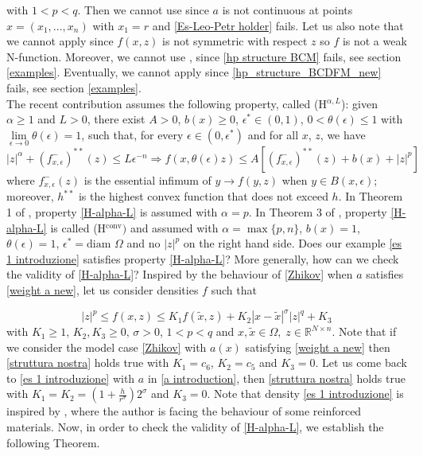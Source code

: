 \documentclass[a4paper,10pt]{article}
\newcommand{\numberset}{\mathbb}
\newcommand{\R}{\numberset{R}}
\theoremstyle{plain}
\theoremstyle{definition}
\def\R{\mathbb{R}}
\numberwithin{equation}{section} \makeatletter
\begin{document}
with $1< p< q$. Then we cannot use \cite{Esposito-Leonetti-Petricca} since $a$ is not continuous at points $x=(x_1,...,x_n)$ with $x_1 = r$  and \eqref{Es-Leo-Petr holder} fails. Let us also note that we cannot apply \cite{BC} since $f(x,z)$ is not symmetric with respect $z$ so $f$ is not a weak N-function. Moreover, we cannot use \cite{BCM}, since \eqref{hp structure BCM} fails, see section \ref{examples}. Eventually, we cannot apply \cite{BCDFM}
since \eqref{hp_structure_BCDFM_new} fails, see section \ref{examples}.\\
The recent contribution \cite{BMT2024} assumes the following property, called (H$^{\alpha,L}$): given $\alpha \geq 1$ and $L>0$, there exist $A>0$, $b(x) \geq 0$, $\epsilon^* \in (0,1)$, $0 < \theta(\epsilon) \leq 1$ with $\lim\limits_{\epsilon \to 0} \theta(\epsilon) = 1$, such that, for every $\epsilon \in (0, \epsilon^*)$ and for all $x$, $z$, we have
\begin{equation}
    \label{H-alpha-L}
  |z|^\alpha +  (f^-_{x,\epsilon})^{**}(z) 
  \leq L \epsilon^{-n} 
  \Longrightarrow
  f(x,\theta(\epsilon) z) \leq A [(f^-_{x,\epsilon})^{**}(z) + b(x) +  |z|^p]
\end{equation}
where $f^-_{x,\epsilon}(z)$ is the essential infimum of $y \to f(y,z)$ when $y \in B(x,\epsilon)$; moreover,  $h^{**}$ is the highest convex function that does not exceed $h$. In Theorem 1 of \cite{BMT2024}, property \eqref{H-alpha-L} is assumed with $\alpha = p$. 
In Theorem 3 of \cite{BBCLM}, property \eqref{H-alpha-L} is called (H$^{\text{conv}})$ and assumed with $\alpha = \max\{p , n \}$, $b(x)=1$, $\theta(\epsilon)=1$, $\epsilon^* = \text{diam } \Omega$ and no $|z|^p$ on the right hand side. Does our example \eqref{es 1 introduzione} satisfies property \eqref{H-alpha-L}? More generally, how can we check the validity of \eqref{H-alpha-L}? Inspired by 
the behaviour of \eqref{Zhikov} when $a$ satisfies \eqref{weight a new}, 
let us 
consider densities {
$f$} such that

\begin{equation}\label{struttura nostra}
  |z|^p\le  f(x,z) \le K_1 f(\tilde{x},z)+K_2|x-\tilde{x}|^{\sigma}|z|^q+K_3 
\end{equation} 
with $K_1\ge 1, \,  K_2, K_3\ge 0,\,  \sigma>0$,  $1<p<q$ and $x, \tilde{x} \in \Omega, \; z \in \R^{N\times n}$. 
Note that if  we consider the model case \eqref{Zhikov} with $a(x)$ satisfying  \eqref{weight a new} then \eqref{struttura nostra} holds true with $K_1=c_6$, $K_2=c_5$ and $K_3=0$. Let us come back to 
\eqref{es 1 introduzione} with $a$ in \eqref{a introduction}, then  \eqref{struttura nostra}  holds true with $K_1=K_2=(1+ \frac h {r^\sigma}) 2^\sigma$ and $K_3=0$. Note that density \eqref{es 1 introduzione} is inspired by \cite{TangQi}, where the 
author is facing the behaviour of some reinforced materials.
Now, in order to check the validity of \eqref{H-alpha-L},  we establish the following Theorem.
\end{document}
